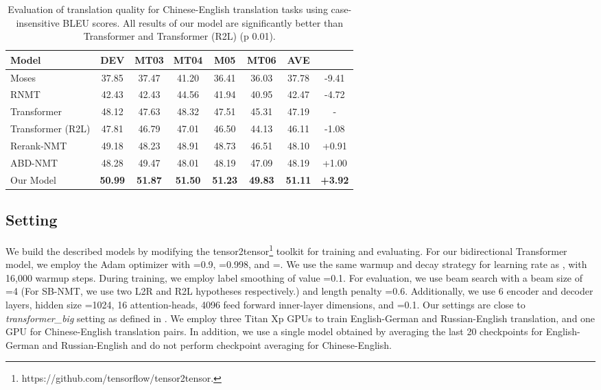 \documentclass[11pt,a4paper]{article}
\begin{document}
\begin{CJK*}{UTF8}{gbsn}
\begin{table*}
	\centering
	\begin{tabular}{l|c|cccc|cc}
		\hline
		Model                 &  DEV      &MT03   &      MT04   &      M05     &      MT06       & AVE      &   \\
		\hline
		\hline
		Moses             &  37.85     & 37.47     &    41.20     &       36.41    &    36.03        &     37.78   & -9.41   \\
		RNMT               &  42.43   &  42.43    &    44.56      &     41.94    &   40.95       &     42.47    &   -4.72\\
		Transformer     &  48.12   &  47.63    &    48.32     &       47.51     &   45.31       &     47.19    & -\\
		Transformer (R2L)  &   47.81    &  46.79     &    47.01      &      46.50   &   44.13       &     46.11    &  -1.08\\
		Rerank-NMT          &  49.18   &  48.23       & 48.91    &     48.73    & 46.51       &     48.10 &  +0.91 \\
		ABD-NMT           &   48.28 &  49.47     &       48.01        &       48.19        &      47.09    &   48.19    & +1.00 \\
		\hline
		\hline
		Our Model         &  \textbf{50.99}    &\textbf{51.87}        &     \textbf{51.50}   &        \textbf{51.23}    &    \textbf{49.83}    &  \textbf{51.11}  & \textbf{+3.92}   \\		
		\hline
	\end{tabular}
	\caption{Evaluation of translation quality for Chinese-English translation tasks using case-insensitive BLEU scores.
		All results of our model are significantly better than Transformer and Transformer (R2L) (p  0.01).
	} \label{CH-EN}
\end{table*}

\subsection{Setting}
We build the described models by modifying the tensor2tensor{\footnote[9]{https://github.com/tensorflow/tensor2tensor.}} toolkit for training and evaluating.
For our bidirectional Transformer model, we employ the Adam optimizer with =0.9, =0.998, and =. We use the same warmup and decay strategy for learning rate as , with 16,000 warmup steps.
During training, we employ label smoothing of value =0.1.
For evaluation, we use beam search with a beam size of =4 (For SB-NMT, we use two L2R and R2L hypotheses respectively.) and length penalty =0.6.
Additionally, we use 6 encoder and decoder layers, hidden size =1024, 16 attention-heads, 4096 feed forward inner-layer dimensions, and =0.1.
Our settings are close to \emph{transformer\_big} setting as defined in .
We employ three Titan Xp GPUs to train English-German and Russian-English translation, and one GPU for Chinese-English translation pairs. In addition, we use a single model obtained by averaging the last 20 checkpoints for English-German and Russian-English and do not perform checkpoint averaging for Chinese-English.






\end{CJK*}
\end{document}
